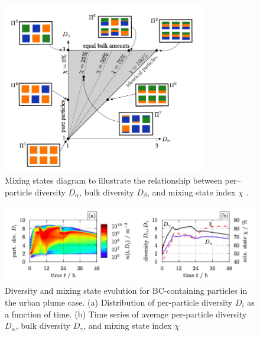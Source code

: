 \documentclass[12pt, fullpage]{uiucthesis2009_2}
\begin{document}
	 \begin{figure}[h] 
	 	\begin{center}
	 		\includegraphics[width = 0.8\textwidth]{Figure28}
	 		\caption[Mixing states diagram to illustrate the relationship between per--particle diversity $D_{\alpha}$, bulk diversity $D_{\beta}$, and mixing state index $\chi$ \citep{Riemer2013}]{\label{fig_P28} Mixing states diagram to illustrate the relationship between per--particle diversity $D_{\alpha}$, bulk diversity $D_{\beta}$, and mixing state index $\chi$ \citep{Riemer2013}.}
	 	\end{center}
	 \end{figure}
	
	\begin{figure}[h] 
		\begin{center}
			\includegraphics[width = 1\textwidth]{Figure06}
			\caption[Diversity and mixing state evolution for BC-containing particles in the urban plume case. (a) Distribution of per-particle diversity $D_{i}$ as a function of time. (b) Time series of average per-particle diversity $D_{\alpha}$, bulk diversity D$D_{\gamma}$, and mixing state index $\chi$ \citep{Riemer2013}]{\label{fig_P6} Diversity and mixing state evolution for BC-containing particles in the urban plume case. (a) Distribution of per-particle diversity $D_{i}$ as a function of time. (b) Time series of average per-particle diversity $D_{\alpha}$, bulk diversity $D_{\gamma}$, and mixing state index $\chi$ \citep{Riemer2013}}
		\end{center}
	\end{figure}
	
\end{document}

